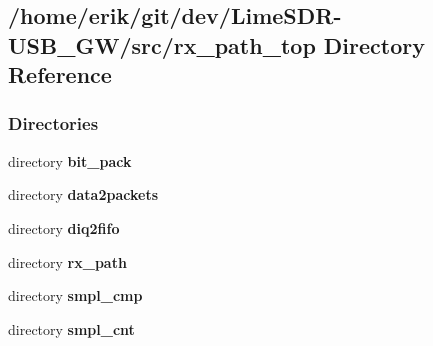 \subsection{/home/erik/git/dev/\+Lime\+S\+D\+R-\/\+U\+S\+B\+\_\+\+G\+W/src/rx\+\_\+path\+\_\+top Directory Reference}
\label{dir_df6f847488791136c4a7659e8c836730}
\subsubsection*{Directories}
\begin{DoxyCompactItemize}
\item 
directory {\bf bit\+\_\+pack}
\item 
directory {\bf data2packets}
\item 
directory {\bf diq2fifo}
\item 
directory {\bf rx\+\_\+path}
\item 
directory {\bf smpl\+\_\+cmp}
\item 
directory {\bf smpl\+\_\+cnt}
\end{DoxyCompactItemize}
